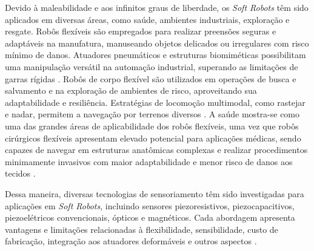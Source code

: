 Devido à maleabilidade e aos infinitos graus de liberdade, os \textit{Soft Robots} têm sido aplicados em diversas áreas, como saúde, ambientes industriais, 
exploração e resgate. Robôs flexíveis são empregados para realizar preensões seguras e adaptáveis na manufatura, manuseando objetos delicados ou irregulares 
com risco mínimo de danos. Atuadores pneumáticos e estruturas biomiméticas possibilitam uma manipulação versátil na automação industrial, superando as 
limitações de garras rígidas \cite{Liu2023} \cite{Xavier202259442}. Robôs de corpo flexível são utilizados em operações de busca e salvamento e na exploração 
de ambientes de risco, aproveitando sua adaptabilidade e resiliência. Estratégias de locomoção multimodal, como rastejar e nadar, permitem a navegação 
por terrenos diversos \cite{Liu2023} \cite{Li2024}. A saúde mostra-se como uma das grandes áreas de aplicabilidade dos robôs flexíveis, uma vez que robôs 
cirúrgicos flexíveis apresentam elevado potencial para aplicações médicas, sendo capazes de navegar em estruturas anatômicas complexas e realizar 
procedimentos minimamente invasivos com maior adaptabilidade e menor risco de danos aos tecidos \cite{rodrigue2024soft}.



Dessa maneira, diversas tecnologias de sensoriamento têm sido investigadas para aplicações em \textit{Soft Robots}, incluindo sensores piezoresistivos, 
piezocapacitivos, piezoelétricos convencionais, ópticos e magnéticos. Cada abordagem apresenta vantagens e limitações relacionadas à flexibilidade, sensibilidade, 
custo de fabricação, integração aos atuadores deformáveis e outros aspectos \cite{Zhou2024}.


